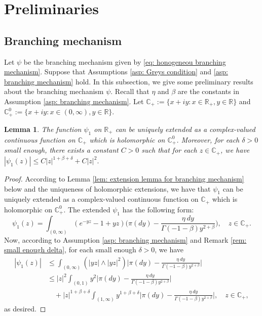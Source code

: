 \documentclass[12pt,a4paper]{amsart}
\theoremstyle{plain}
\newtheorem{lem}[thm]{Lemma}
\theoremstyle{definition}
\numberwithin{equation}{section}
\begin{document}
\section{Preliminaries}
\subsection{Branching mechanism}
\label{sec: branching mechanism}
	Let $\psi$ be the branching mechanism given by \eqref{eq: honogeneou branching mechanism}.
	Suppose that Assumptions \ref{asp: Greys condition} and \ref{asp: branching mechanism} hold.
	In this subsection, we give some preliminary results about the branching mechanism $\psi$.
	Recall that $\eta$ and $\beta$ are the constants in Assumption \ref{asp: branching mechanism}.
	Let $\mathbb C_+:= \{x+iy: x\in \mathbb R_+, y \in \mathbb R\}$ and $\mathbb C^0_+:= \{x+iy: x\in (0,\infty), y \in \mathbb R\}$.
\begin{lem}
\label{lem: complex extension for psi1}
	The function $\psi_1$ on $\mathbb R_+$ can be uniquely extended as a complex-valued continuous function on $\mathbb C_+$ which is holomorphic on $\mathbb C^0_+$.
		Moreover, for each $\delta > 0$ small enough, there exists a  constant $C>0$ such that for each $z\in \mathbb C_+$, we have
$
	|\psi_1(z)| \leq C |z|^{1+\beta+\delta} + C|z|^2.
$
\end{lem}
\begin{proof}
According to Lemma \ref{lem: extension lemma for branching mechanism} below and 
the uniqueness of holomorphic extensions, 
	we have that $\psi_1$ can be uniquely extended as a complex-valued continuous function on $\mathbb C_+$ which is holomorphic on $\mathbb C^0_+$.
	The extended $\psi_1$ has the following form:
\[
	\psi_1(z)= \int_{(0,\infty)}(e^{-yz}-1+yz) \Big(\pi(dy) - \frac{\eta~dy}{\Gamma(-1-\beta)y^{2+\beta}}\Big),
	\quad z\in \mathbb C_+.
\]
	Now, according to  Assumption \ref{asp: branching mechanism} and Remark \ref{rem: small enough delta}, for each small enough $\delta > 0$, we have
\begin{align}
	|\psi_1(z)|
	&\leq \int_{(0,\infty)} (|yz|\wedge |yz|^2) \Big|\pi(dy) - \frac{\eta~dy}{\Gamma(-1-\beta)y^{2+\beta}}\Big|
	\\&\leq  |z|^2\int_{(0,1)} y^2 \Big|\pi(dy) - \frac{\eta~dy}{\Gamma(-1-\beta)y^{2+\beta}}\Big|
	\\&\quad + |z|^{1+\beta +\delta}\int_{(1,\infty)} y^{1+\beta + \delta} \Big|\pi(dy) - \frac{\eta~dy}{\Gamma(-1-\beta)y^{2+\beta}}\Big|,
    \quad z \in \mathbb C_+,
\end{align}
	as desired.
\end{proof}
\end{document}
